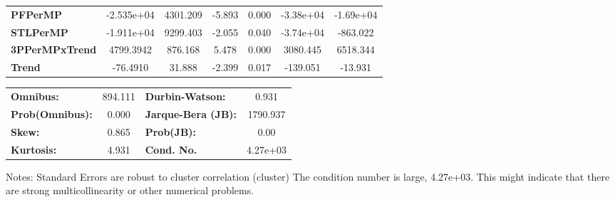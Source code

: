 \begin{center}
\begin{tabular}{lcccccc}
\textbf{PFPerMP}       &   -2.535e+04  &     4301.209     &    -5.893  &         0.000        &    -3.38e+04    &    -1.69e+04     \\
\textbf{STLPerMP}      &   -1.911e+04  &     9299.403     &    -2.055  &         0.040        &    -3.74e+04    &     -863.022     \\
\textbf{3PPerMPxTrend} &    4799.3942  &      876.168     &     5.478  &         0.000        &     3080.445    &     6518.344     \\
\textbf{Trend}         &     -76.4910  &       31.888     &    -2.399  &         0.017        &     -139.051    &      -13.931     \\
\bottomrule
\end{tabular}
\begin{tabular}{lclc}
\textbf{Omnibus:}       & 894.111 & \textbf{  Durbin-Watson:     } &    0.931  \\
\textbf{Prob(Omnibus):} &   0.000 & \textbf{  Jarque-Bera (JB):  } & 1790.937  \\
\textbf{Skew:}          &   0.865 & \textbf{  Prob(JB):          } &     0.00  \\
\textbf{Kurtosis:}      &   4.931 & \textbf{  Cond. No.          } & 4.27e+03  \\
\bottomrule
\end{tabular}
\end{center}

Notes: \newline
 [1] Standard Errors are robust to cluster correlation (cluster) \newline
 [2] The condition number is large, 4.27e+03. This might indicate that there are \newline
 strong multicollinearity or other numerical problems.